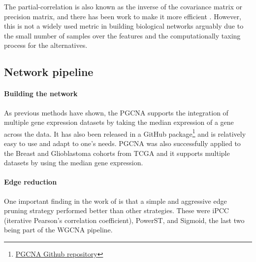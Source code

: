 The partial-correlation is also known as the inverse of the covariance matrix or precision matrix, and there has been work to make it more efficient \citep{Ghanbari2019-tq}. However, this is not a widely used metric in building biological networks arguably due to the small number of samples over the features and the computationally taxing process for the alternatives.

\subsection{Network pipeline}

\vspace{3mm}
\vspace{3mm}

\paragraph*{Building the network} 

As previous methods have shown, the PGCNA supports the integration of multiple gene expression datasets by taking the median expression of a gene across the data. It has also been released in a GitHub package\footnote{\href{https://github.com/medmaca/PGCNA}{PGCNA Github repository}} and is relatively easy to use and adapt to one's needs. PGCNA was also successfully applied to the Breast and Glioblastoma cohorts from TCGA and it supports multiple datasets by using the median gene expression.

\paragraph*{Edge reduction}

One important finding in the work of \citet{Care2019-ij} is that a simple and aggressive edge pruning strategy performed better than other strategies. These were iPCC (iterative Pearson's correlation coefficient), PowerST, and Sigmoid, the last two being part of the WGCNA pipeline.

